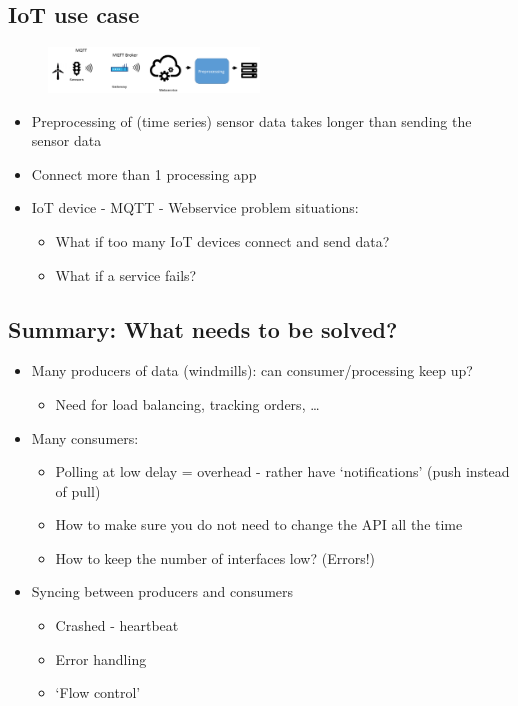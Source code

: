 \documentclass{article}
\begin{document}
\subsection{IoT use case}

\begin{figure}[H]
    \centering
    \includegraphics[width=0.5\textwidth]{streamprocessing-iot-usecase.png}
\end{figure}

\begin{itemize}
    \item Preprocessing of (time series) sensor data takes longer than sending the sensor data
    \item Connect more than 1 processing app
    \item IoT device - MQTT - Webservice problem situations:
    \begin{itemize}
        \item What if too many IoT devices connect and send data?
        \item What if a service fails?
    \end{itemize}
\end{itemize}

\subsection{Summary: What needs to be solved?}

\begin{itemize}
    \item Many producers of data (windmills): can consumer/processing keep up?
    \begin{itemize}
        \item Need for load balancing, tracking orders, \dots
    \end{itemize}
    \item Many consumers:
    \begin{itemize}
        \item Polling at low delay = overhead - rather have `notifications' (push instead of pull)
        \item How to make sure you do not need to change the API all the time
        \item How to keep the number of interfaces low? (Errors!)
    \end{itemize}
    \item Syncing between producers and consumers
    \begin{itemize}
        \item Crashed - heartbeat
        \item Error handling
        \item `Flow control'
    \end{itemize}
\end{itemize}
\end{document}
